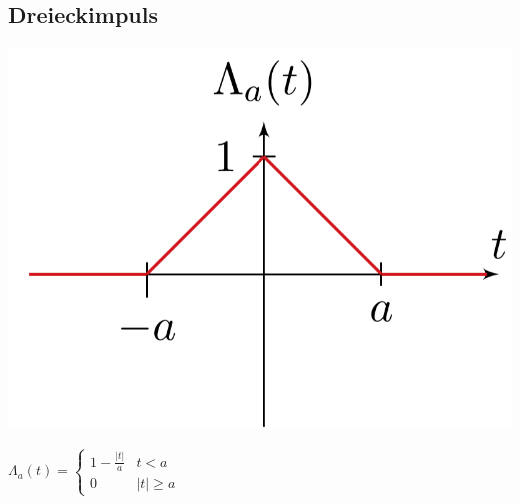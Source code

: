 	\subsection{Dreieckimpuls}
		\begin{minipage}{0.2\textwidth}
			\includegraphics[width=\textwidth]{./bilder/funktionen/dreieckF.png}
		\end{minipage}
		\qquad
		\begin{minipage}{0.45\textwidth}
			$\Lambda_{a}(t)=\begin{cases}{1-\frac{|t|}{a}} & {t<a} \\ {0} & {|t| \geq a}\end{cases}$
		\end{minipage}
		\qquad
		\begin{minipage}{0.25\textwidth}						
		\end{minipage}
	
	
